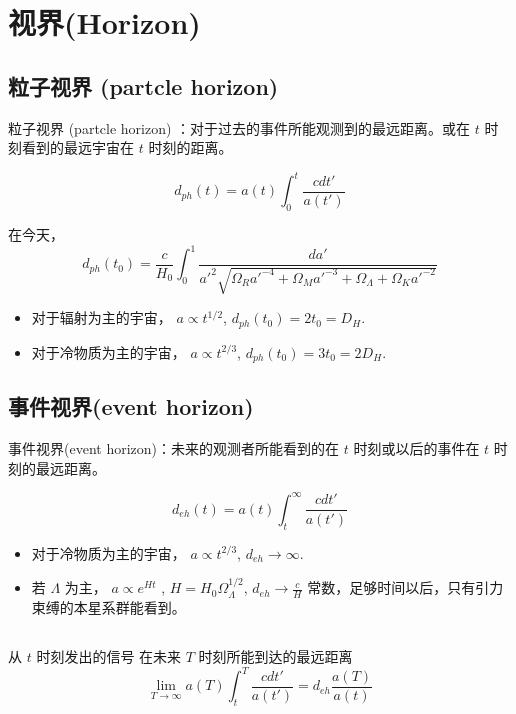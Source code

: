 \documentclass[]{ctexart}
\begin{document}
\section{视界(Horizon)}

\subsection{粒子视界 (partcle horizon)}
粒子视界 (partcle horizon) ：对于过去的事件所能观测到的最远距离。或在 $t$ 时刻看到的最远宇宙在 $t$ 时刻的距离。

\begin{equation}
    d_{ph}(t) = a(t) \int_0^t \frac{cdt'}{a(t')} 
\end{equation}

在今天，
\begin{equation}
    d_{ph}(t_0) = \frac{c}{H_0}\int_0^1 \frac{da'}{a'^2 \sqrt{\Omega_R a'^{-4}+\Omega_M a'^{-3}+\Omega_\Lambda+\Omega_K a'^{-2}} }
\end{equation}

\begin{itemize}
    \item 对于辐射为主的宇宙， $a\propto t^{1/2}$, $d_{ph}(t_0)=2t_0 = D_H$.
    \item 对于冷物质为主的宇宙， $a\propto t^{2/3}$, $d_{ph}(t_0)=3t_0 = 2 D_H$. 
\end{itemize}

\subsection{事件视界(event horizon)}
事件视界(event horizon)：未来的观测者所能看到的在 $t$ 时刻或以后的事件在 $t$ 时刻的最远距离。

\begin{equation}
    d_{eh}(t) = a(t) \int_t^\infty \frac{cdt'}{a(t')} 
\end{equation}

\begin{itemize}
    \item 对于冷物质为主的宇宙， $a\propto t^{2/3}$, $d_{eh}\to \infty$. 
    \item 若 $\Lambda$ 为主， $a\propto e^{Ht}$ , $H=H_0 \Omega_\Lambda^{1/2}$,  $d_{eh}\to \frac{c}{H}$ 常数，足够时间以后，只有引力束缚的本星系群能看到。 
\end{itemize}

\subsection{}
从  $t$ 时刻发出的信号 在未来 $T$ 时刻所能到达的最远距离
\begin{equation}
    \lim_{T \to \infty}   a(T) \int_t^T \frac{cdt'}{a(t')} = d_{eh} \frac{a(T)}{a(t)}
\end{equation}
\end{document}

